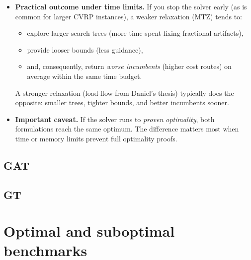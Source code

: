\documentclass[a4paper,twoside]{article}
\begin{document}
\begin{itemize}
  \item \textbf{Practical outcome under time limits.} If you stop the solver early (as is common for larger CVRP instances), a weaker relaxation (MTZ) tends to:
  \begin{itemize}
    \item explore larger search trees (more time spent fixing fractional artifacts),
    \item provide looser bounds (less guidance),
    \item and, consequently, return \emph{worse incumbents} (higher cost routes) on average within the same time budget.
  \end{itemize}
  A stronger relaxation (load-flow from Daniel’s thesis) typically does the opposite: smaller trees, tighter bounds, and better incumbents sooner.

  \item \textbf{Important caveat.} If the solver runs to \emph{proven optimality}, both formulations reach the same optimum. The difference matters most when time or memory limits prevent full optimality proofs.
\end{itemize}



\subsection{GAT}


\subsection{GT}


\section{Optimal and suboptimal benchmarks}
\end{document}
